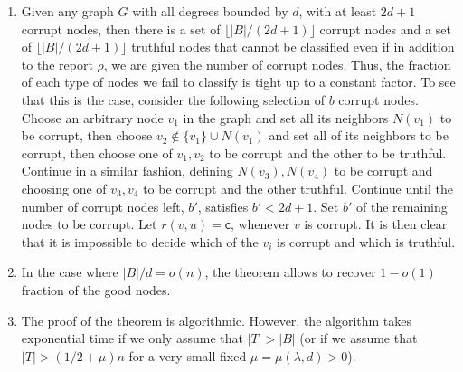 \documentclass[11pt]{article}
\numberwithin{equation}{section}
\theoremstyle{definition}
\theoremstyle{plain}
\begin{document}
\begin{enumerate}
\item Given any graph $G$ with all degrees bounded by $d$, with 
at least $2d+1$ corrupt nodes, then there is a set of 
 $\lfloor |B|/(2d+1) \rfloor$ corrupt nodes and a set of 
$\lfloor |B|/(2d+1) \rfloor$ truthful nodes
%
that  %
cannot be %
classified   %
even if in addition to the report $\rho$, we are given the number of 
corrupt nodes. Thus, the
%
fraction of each type of nodes 
we fail to classify is 
%
%
%
%
%
%
tight up to a constant factor. 
To see that this is the case, consider the following selection of $b$ 
%
%
%
corrupt nodes. Choose   %
an arbitrary node $v_1$ in the graph and set all its neighbors $N(v_1)$ to be corrupt, then choose $v_2 \notin \{ v_1 \} \cup N(v_1)$ and set all of its neighbors to be corrupt, then choose one of $v_1,v_2$ to be corrupt 
and the other to be truthful. Continue in a similar fashion, defining $N(v_3),N(v_4)$ to be corrupt and choosing one of $v_3,v_4$ to be corrupt and the other truthful. 
Continue until the number of corrupt nodes left, 
$b'$,   %
satisfies $b' < 2d+1$. 
%
%
Set $b'$ of the remaining nodes to be corrupt. 
%
 Let $r(v,u) = \mathsf{c}$, whenever $v$ is corrupt.  It is then clear that it is impossible to decide which of the $v_i$ is corrupt and which is truthful.
 
\item In the case where $|B|/d = o(n)$,  the theorem allows to recover 
$1-o(1)$ fraction of the good nodes. 

\item 
%
%
%
%
The proof of the theorem is algorithmic.  However,
the algorithm takes exponential time   %
if we only assume that $|T|>|B|$ (or if we assume that
$|T|>(1/2+\mu)n$ for a very small fixed $\mu=\mu(\lambda,d)>0$). 
\end{enumerate} 
\end{document}

